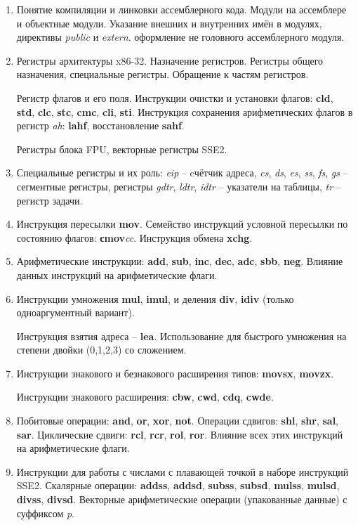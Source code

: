 \documentclass[a4paper,10pt]{article}
\begin{document}
\begin{enumerate}
    \item
       Понятие компиляции и линковки ассемблерного кода. Модули на ассемблере и объектные модули.
       Указание внешних и внутренних имён в модулях, директивы \textit{public} и \textit{extern}.
       оформление не головного ассемблерного модуля.
    
    \item
       Регистры архитектуры x86-32. Назначение регистров. Регистры общего назначения, специальные регистры. Обращение к частям регистров.
       
       Регистр флагов и его поля.
            Инструкции очистки и установки флагов: \textbf{cld}, \textbf{std}, \textbf{clc}, \textbf{stc}, \textbf{cmc}, \textbf{cli},
            \textbf{sti}.
            Инструкция сохранения арифметических флагов в регистр \textit{ah}: \textbf{lahf}, восстановление \textbf{sahf}.
    
       Регистры блока FPU, векторные регистры SSE2.
    \item
        Специальные регистры и их роль:
            \textit{eip} -- cчётчик адреса, \textit{cs}, \textit{ds}, \textit{es}, \textit{ss}, \textit{fs}, \textit{gs} -- сегментные регистры,
            регистры \textit{gdtr}, \textit{ldtr}, \textit{idtr} -- указатели на таблицы, \textit{tr} -- регистр задачи.
    \item
        Инструкция пересылки \textbf{mov}. Семейство инструкций условной пересылки по состоянию флагов: \textbf{сmov}\textit{cc}.
        Инструкция обмена \textbf{xchg}.
    \item
        Арифметические инструкции: \textbf{add}, \textbf{sub}, \textbf{inc}, \textbf{dec}, \textbf{adc}, \textbf{sbb}, \textbf{neg}.
        Влияние данных инструкций на арифметические флаги.
    \item
        Инструкции умножения \textbf{mul}, \textbf{imul}, и деления \textbf{div}, \textbf{idiv} (только одноаргументный вариант).
    
            Инструкция взятия адреса -- \textbf{lea}. Использование для быстрого умножения на степени двойки (0,1,2,3) со сложением.
    
    \item
        Инструкции знакового и безнакового расширения типов: \textbf{movsx}, \textbf{movzx}.
    
        Инструкции знакового расширения: \textbf{cbw}, \textbf{cwd}, \textbf{cdq}, \textbf{cwde}.
    
    \item
        Побитовые операции: \textbf{and}, \textbf{or}, \textbf{xor}, \textbf{not}. Операции сдвигов: \textbf{shl}, \textbf{shr}, \textbf{sal}, 
        \textbf{sar}. Циклические сдвиги: \textbf{rcl}, \textbf{rcr}, \textbf{rol}, \textbf{ror}. 
        Влияние всех этих инструкций на арифметические флаги.
    \item    
        Инструкции для работы с числами с плавающей точкой в наборе инструкций SSE2.
        Скалярные операции: \textbf{addss}, \textbf{addsd}, \textbf{subss}, \textbf{subsd}, \textbf{mulss}, \textbf{mulsd}, 
                            \textbf{divss}, \textbf{divsd}.
        Векторные арифметические операции (упакованные данные) с суффиксом \textit{p}.
    

\end{enumerate}
\end{document}
